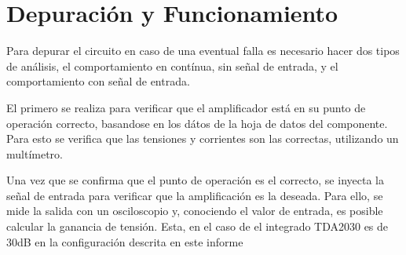 \section{Depuración y Funcionamiento}

Para depurar el circuito en caso de una eventual falla es necesario hacer dos tipos de análisis, el comportamiento en contínua, sin señal de entrada, y el comportamiento con señal de entrada.

El primero se realiza para verificar que el amplificador está en su punto de operación correcto, basandose en los dátos de la hoja de datos del componente. Para esto se verifica que las tensiones y corrientes son las correctas, utilizando un multímetro.

Una vez que se confirma que el punto de operación es el correcto, se inyecta la señal de entrada para verificar que la amplificación es la deseada. Para ello, se mide la salida con un osciloscopio y, conociendo el valor de entrada, es posible calcular la ganancia de tensión. Esta, en el caso de el integrado TDA2030 es de 30dB en la configuración descrita en este informe
